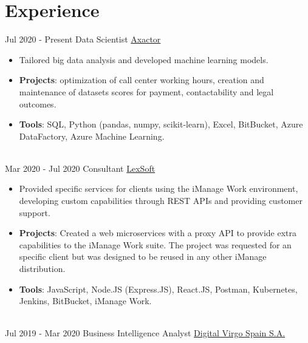 \documentclass[letterpaper]{twentysecondcv} %
\begin{document}
\makeprofile %
 

\section{Experience}
\begin{twenty} %
\twentyitem
    	{Jul 2020 -}
		{Present}
        {Data Scientist}
        {\href{https://www.axactor.com/}{Axactor}}
        {}
        {\begin{itemize}
        \item Tailored big data analysis and developed machine learning models.
        \item \textbf{Projects}: optimization of call center working hours, creation and maintenance of datasets scores for payment, contactability and legal outcomes.
        \item \textbf{Tools}: SQL, Python (pandas, numpy, scikit-learn), Excel, BitBucket, Azure DataFactory, Azure Machine Learning.
        \end{itemize}}
        \\
	\twentyitem
    	{Mar 2020 -}
		{Jul 2020}
        {Consultant}
        {\href{www.lex-soft.com}{LexSoft}}
        {}
        {
        {\begin{itemize}
        \item Provided specific services for clients using the iManage Work environment, developing custom capabilities through REST APIs and providing customer support.
        \item \textbf{Projects}: Created a web microservices with a proxy API to provide extra capabilities to the iManage Work suite. The project was requested for an specific client but was designed to be reused in any other iManage distribution.
        \item \textbf{Tools}: JavaScript, Node.JS (Express.JS), React.JS, Postman, Kubernetes, Jenkins, BitBucket, iManage Work. 
    \end{itemize}}
        }
    \\   
    \twentyitem
   		{Jul 2019 -}
		{Mar 2020}
        {Business Intelligence Analyst}
        {\href{https://www.digitalvirgo.com/}{Digital Virgo Spain S.A.}}
        {}
        {
        {\begin{itemize}

\end{itemize}}}
\end{twenty}
\end{document}
